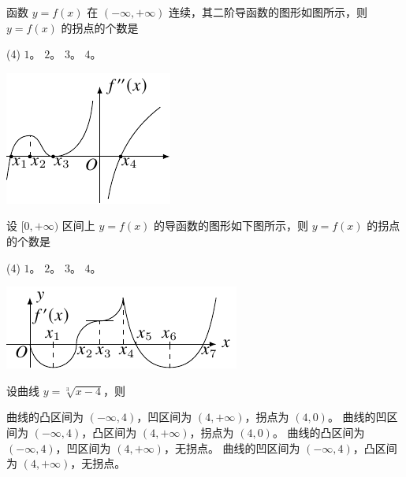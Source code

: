 \begin{ti}
	\parbox[t]{0.7\textwidth}{\vspace{0pt}%
	函数 $y=f(x)$ 在 $(-\infty,+\infty)$ 连续，其二阶导函数的图形如图所示，则 $y=f(x)$ 的拐点的个数是
	\begin{tasks}(4)
		\task $1$。
		\task $2$。
		\task $3$。
		\task $4$。
	\end{tasks}
	}%
	\begin{varwidth}[t]{\textwidth}
		\vspace{0pt}\includegraphics{figure/fig169.pdf}
	\end{varwidth}
\end{ti}

\begin{ti}
	\parbox[t]{0.58\textwidth}{\vspace{0pt}%
	设 $[0,+\infty)$ 区间上 $y=f(x)$ 的导函数的图形如下图所示，则 $y=f(x)$ 的拐点的个数是
	\begin{tasks}(4)
		\task $1$。
		\task $2$。
		\task $3$。
		\task $4$。
	\end{tasks}
	}%
	\begin{varwidth}[t]{\textwidth}
		\vspace{0pt}\includegraphics{figure/fig170.pdf}
	\end{varwidth}
\end{ti}

\begin{ti}
	设曲线 $y = \sqrt[3]{x-4}$，则
	\begin{tasks}
		\task 曲线的凸区间为 $(-\infty,4)$，凹区间为 $(4,+\infty)$，拐点为 $(4,0)$。
		\task 曲线的凹区间为 $(-\infty,4)$，凸区间为 $(4,+\infty)$，拐点为 $(4,0)$。
		\task 曲线的凸区间为 $(-\infty,4)$，凹区间为 $(4,+\infty)$，无拐点。
		\task 曲线的凹区间为 $(-\infty,4)$，凸区间为 $(4,+\infty)$，无拐点。
	\end{tasks}
\end{ti}

